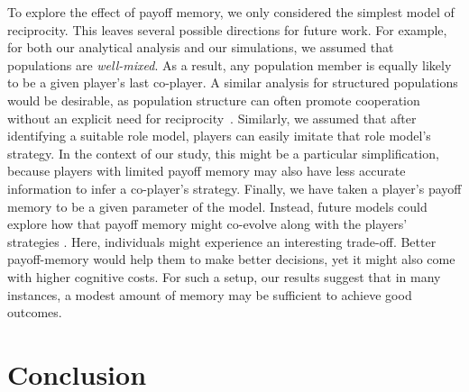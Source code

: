 \documentclass[11pt]{article}
\theoremstyle{plainCl1}
\theoremstyle{plainCl2}
\begin{document}
To explore the effect of payoff memory, we only considered the simplest model of reciprocity. 
This leaves several possible directions for future work. 
For example, for both our analytical analysis and our simulations, we assumed that populations are {\it well-mixed}. 
As a result, any population member is equally likely to be a given player's last co-player. 
A similar analysis for structured populations would be desirable, as population structure can often promote cooperation without an explicit need for reciprocity~\citep{szabo:PR:2007,van-veelen:PNAS:2012}.
Similarly, we assumed that after identifying a suitable role model, players can easily imitate that role model's strategy. 
In the context of our study, this might be a particular simplification, because players with limited payoff memory may also have less accurate information to infer a co-player's strategy. 
 Finally, we have taken a player's payoff memory to be a given parameter of the model. 
 Instead, future models could explore how that payoff memory might co-evolve along with the players' strategies \citep[similar to previous work on the evolution of the players' feasible strategy sets, e.g.][]{Stewart2016,Schmid:PlosCB:2022,Murase:PLoSCompBio:2023a}. 
 Here, individuals might experience an interesting trade-off. 
 Better payoff-memory would help them to make better decisions, yet it might also come with higher cognitive costs. 
 For such a setup, our results suggest that in many instances, a modest amount of memory may be sufficient to achieve good outcomes. 
 
 

\section{Conclusion}\label{section:discussion}
\end{document}
